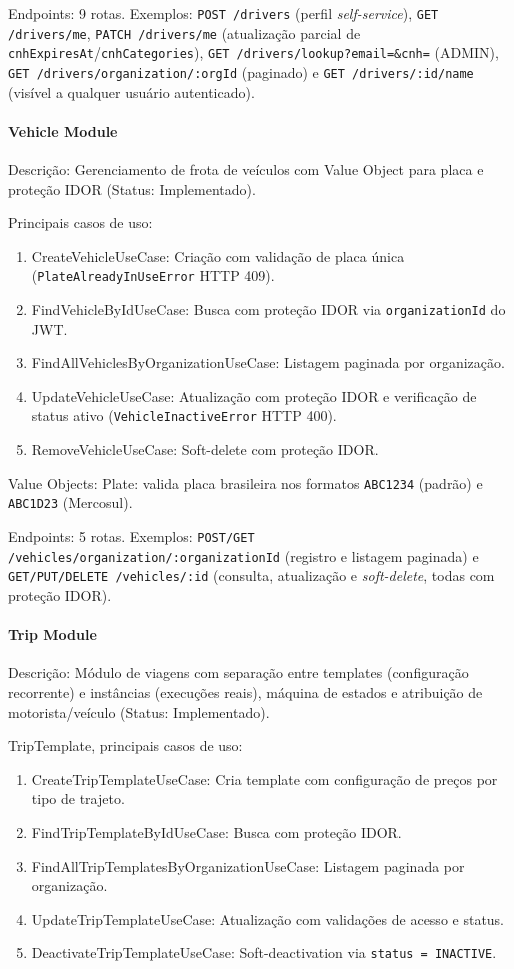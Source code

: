 Endpoints: 9 rotas. Exemplos: \texttt{POST /drivers} (perfil \textit{self-service}), \texttt{GET /drivers/me}, \texttt{PATCH /drivers/me} (atualização parcial de \texttt{cnhExpiresAt}/\texttt{cnhCategories}), \texttt{GET /drivers/lookup?email=\&cnh=} (ADMIN), \texttt{GET /drivers/organization/:orgId} (paginado) e \texttt{GET /drivers/:id/name} (visível a qualquer usuário autenticado).

\paragraph{Vehicle Module}

Descrição: Gerenciamento de frota de veículos com Value Object para placa e proteção IDOR (Status: Implementado).

Principais casos de uso:
\begin{enumerate}
\item CreateVehicleUseCase: Criação com validação de placa única (\texttt{PlateAlreadyInUseError} HTTP 409).
\item FindVehicleByIdUseCase: Busca com proteção IDOR via \texttt{organizationId} do JWT.
\item FindAllVehiclesByOrganizationUseCase: Listagem paginada por organização.
\item UpdateVehicleUseCase: Atualização com proteção IDOR e verificação de status ativo (\texttt{VehicleInactiveError} HTTP 400).
\item RemoveVehicleUseCase: Soft-delete com proteção IDOR.
\end{enumerate}

Value Objects: Plate: valida placa brasileira nos formatos \texttt{ABC1234} (padrão) e \texttt{ABC1D23} (Mercosul).

Endpoints: 5 rotas. Exemplos: \texttt{POST/GET /vehicles/organization/:organizationId} (registro e listagem paginada) e \texttt{GET/PUT/DELETE /vehicles/:id} (consulta, atualização e \textit{soft-delete}, todas com proteção IDOR).

\paragraph{Trip Module}

Descrição: Módulo de viagens com separação entre templates (configuração recorrente) e instâncias (execuções reais), máquina de estados e atribuição de motorista/veículo (Status: Implementado).

TripTemplate, principais casos de uso:
\begin{enumerate}
\item CreateTripTemplateUseCase: Cria template com configuração de preços por tipo de trajeto.
\item FindTripTemplateByIdUseCase: Busca com proteção IDOR.
\item FindAllTripTemplatesByOrganizationUseCase: Listagem paginada por organização.
\item UpdateTripTemplateUseCase: Atualização com validações de acesso e status.
\item DeactivateTripTemplateUseCase: Soft-deactivation via \texttt{status = INACTIVE}.
\end{enumerate}

